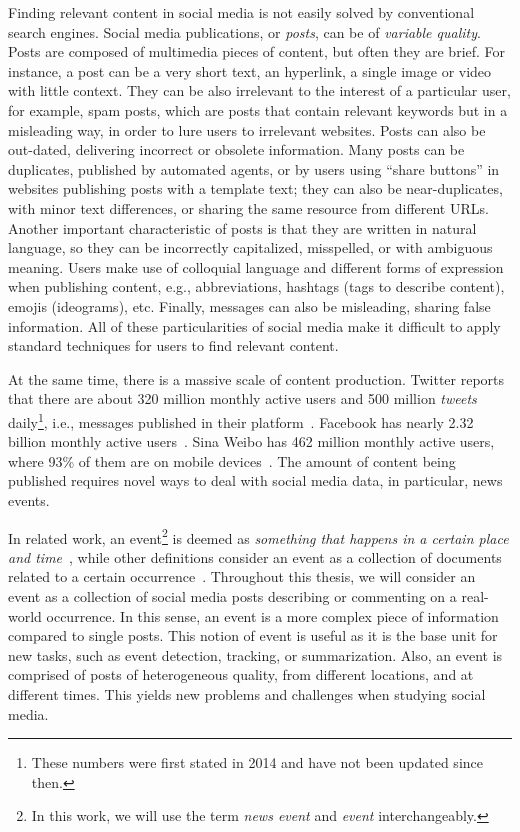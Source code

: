 Finding relevant content in social media is not easily solved by conventional
search engines.
%
Social media publications, or {\em posts}, can be of {\em variable quality}.
%
Posts are composed of multimedia pieces of content, but often they are brief.
%
For instance, a post can be a very short text, an hyperlink, a single image or
video with little context.
%
They can be also irrelevant to the interest of a particular user, for example,
spam posts, which are posts that contain relevant keywords but in a misleading way, in
order to lure users to irrelevant websites. 
%
Posts can also be out-dated, delivering incorrect or obsolete information. 
%
Many posts can be duplicates, published by automated agents, or by users
using ``share buttons'' in websites publishing posts with a template text; 
%
they can also be near-duplicates, with minor text differences, or sharing the
same resource from different URLs.
%
Another important characteristic of posts is that they are written in natural
language, so they can be incorrectly capitalized, misspelled, or with ambiguous
meaning.
%
Users make use of colloquial language and different forms of expression when
publishing content, e.g., abbreviations, hashtags (tags to describe content),
emojis (ideograms), etc.
%
Finally, messages can also be misleading, sharing false information.
%
All of these particularities of social media make it difficult to apply standard
techniques for users to find relevant content.


At the same time, there is a massive scale of content production.
%
Twitter reports that there are about 320 million monthly active users and 500
million {\em tweets} daily\footnote{These numbers were first stated in 2014 and
have not been updated since then.}, i.e., messages published in their
platform~\cite{twitter2014}. 
%
Facebook has nearly 2.32 billion monthly active users~\cite{fbnewsroom}. 
%
Sina Weibo has 462 million monthly active users, where 93\% of them are on
mobile devices~\cite{chinawatch}.
%
The amount of content being published requires novel ways to deal with social
media data, in particular, news events.



%
In related work, an event\footnote{In this work, we will use the term {\em news
event} and {\em event} interchangeably.} is deemed as {\em something that happens
in a certain place and time}~\cite{yang1999learning}, while other definitions
consider an event as a collection of documents related to a certain
occurrence~\cite{Becker:2010:LSM:1718487.1718524}.
%
Throughout this thesis, we will consider an event as a collection of
social media posts describing or commenting on a real-world occurrence.
%
In this sense, an event is a more complex piece of information compared to
single posts.
%
This notion of event is useful as it is the base unit for new tasks, such as
event detection, tracking, or summarization.
%
Also, an event is comprised of posts of heterogeneous quality, from different
locations, and at different times.
%
This yields new problems and challenges when studying social media.

